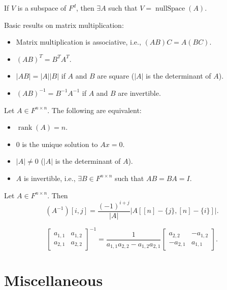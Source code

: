 \documentclass[a4paper,12pt,fleqn]{article}
\newenvironment*{tightemize}{\begin{itemize}[noitemsep]}{\end{itemize}}
\DeclareMathOperator{\rank}{rank}
\DeclareMathOperator{\nullSpace}{nullSpace}
\begin{document}
\begin{theorem}[DWAP]
If $V$ is a subspace of $F^d$, then $\exists A$ such that $V = \nullSpace(A)$.
\end{theorem}

\begin{theorem}[DWAP]
Basic results on matrix multiplication:
\begin{tightemize}
\item Matrix multiplication is associative, i.e., $(AB)C = A(BC)$.
\item $(AB)^T = B^TA^T$.
\item $|AB| = |A||B|$ if $A$ and $B$ are square ($|A|$ is the determinant of $A$).
\item $(AB)^{-1} = B^{-1}A^{-1}$ if $A$ and $B$ are invertible.
\end{tightemize}
\end{theorem}

\begin{theorem}
Let $A \in F^{n \times n}$. The following are equivalent:
\begin{tightemize}
\item $\rank(A) = n$.
\item 0 is the unique solution to $Ax = 0$.
\item $|A| \neq 0$ ($|A|$ is the determinant of $A$).
\item $A$ is invertible, i.e., $\exists B \in F^{n \times n}$ such that $AB = BA = I$.
\end{tightemize}
\end{theorem}

\begin{theorem}
Let $A \in F^{n \times n}$. Then
\[ (A^{-1})[i, j] = \frac{(-1)^{i+j}}{|A|}|A[[n]-\{j\}, [n]-\{i\}]|. \]
\end{theorem}
\begin{corollary}
\[ \begin{bmatrix}a_{1,1} & a_{1,2} \\ a_{2,1} & a_{2,2}\end{bmatrix}^{-1}
= \frac{1}{a_{1,1}a_{2,2} - a_{1,2}a_{2,1}}
\begin{bmatrix}a_{2,2} & -a_{1,2} \\ -a_{2,1} & a_{1,1}\end{bmatrix}. \]
\end{corollary}

\section{Miscellaneous}
\end{document}
